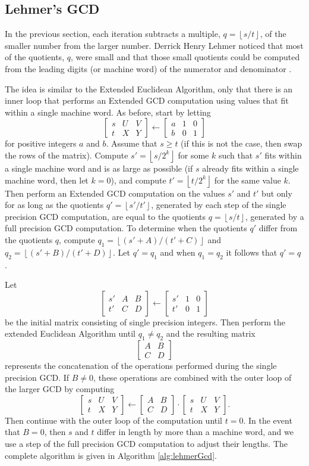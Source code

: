 \documentclass{ucalgthes1}
\theoremstyle{definition}
\newcommand{\matrixtt}[4]{\left[ \begin{array}{rr} #1 & #2 \\ #3 & #4 \end{array} \right]}
\newcommand{\matrixThreeTwo}[6]{\left[ \begin{array}{rrr} #1 & #2 & #3 \\ #4 & #5 & #6 \end{array} \right]}
\newcommand{\floor}[1]{\left\lfloor #1 \right\rfloor}
\begin{document}
\subsection{Lehmer's GCD}

In the previous section, each iteration subtracts a multiple, $q = \floor{s / t}$, of the smaller number from the larger number.  Derrick Henry Lehmer noticed that most of the quotients, $q$, were small and that those small quotients could be computed from the leading digits (or machine word) of the numerator and denominator \cite{Lehmer1938}.

The idea is similar to the Extended Euclidean Algorithm, only that there is an inner loop that performs an Extended GCD computation using values that fit within a single machine word.  As before, start by letting
\[
	\matrixThreeTwo{s}{U}{V}{t}{X}{Y} \gets \matrixThreeTwo{a}{1}{0}{b}{0}{1}
\]
for positive integers $a$ and $b$.  Assume that $s \ge t$ (if this is not the case, then swap the rows of the matrix).  Compute $s'=\floor{s/2^k}$ for some $k$ such that $s'$ fits within a single machine word and is as large as possible (if $s$ already fits within a single machine word, then let $k=0$), and compute $t' = \floor{t/2^k}$ for the same value $k$.  Then perform an Extended GCD computation on the values $s'$ and $t'$ but only for as long as the quotients $q'=\floor{s'/t'}$, generated by each step of the single precision GCD computation, are equal to the quotients $q=\floor{s/t}$, generated by a full precision GCD computation.  To determine when the quotients $q'$ differ from the quotients $q$, compute $q_1 = \floor{(s'+A)/(t'+C)}$ and $q_2 = \floor{(s'+B)/(t'+D)}$.  Let $q' = q_1$ and when $q_1 = q_2$ it follows that $q' = q$ \cite[p.229,~Theorem~A]{Lehmer1938}.

Let
\[
\matrixThreeTwo{s'}{A}{B}{t'}{C}{D} \gets \matrixThreeTwo{s'}{1}{0}{t'}{0}{1}
\]
be the initial matrix consisting of single precision integers.  Then perform the extended Euclidean Algorithm until $q_1 \neq q_2$ and the resulting matrix
\[
\matrixtt{A}{B}{C}{D}
\]
represents the concatenation of the operations performed during the single precision GCD.  If $B \neq 0$, these operations are combined with the outer loop of the larger GCD by computing
\[
\matrixThreeTwo{s}{U}{V}{t}{X}{Y} \gets \matrixtt{A}{B}{C}{D}
		        \cdot \matrixThreeTwo{s}{U}{V}{t}{X}{Y}.
\]
Then continue with the outer loop of the computation until $t = 0$.  In the event that $B=0$, then $s$ and $t$ differ in length by more than a machine word, and we use a step of the full precision GCD computation to adjust their lengths.  The complete algorithm is given in Algorithm \ref{alg:lehmerGcd}.
\end{document}
